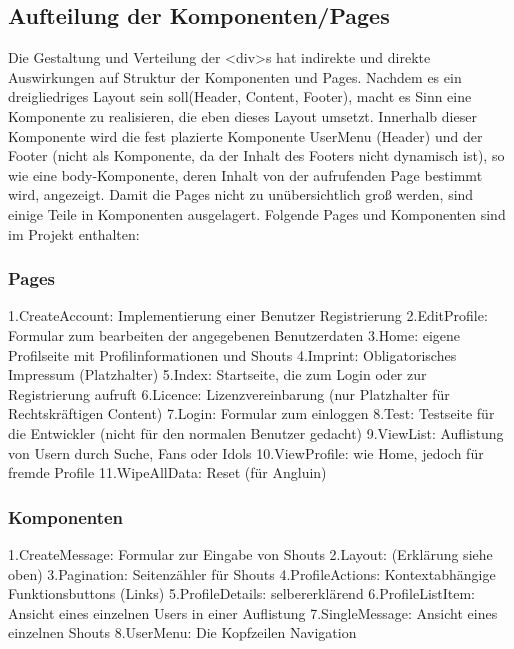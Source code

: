 \documentclass[12pt,a4paper]{article}
\begin{document}
\subsection{Aufteilung der Komponenten/Pages}
Die Gestaltung und Verteilung der <div>s hat indirekte und direkte Auswirkungen auf Struktur der Komponenten und Pages. Nachdem es ein dreigliedriges Layout sein soll(Header, Content, Footer), macht es Sinn eine Komponente zu realisieren, die eben dieses Layout umsetzt. Innerhalb dieser Komponente wird die fest plazierte Komponente UserMenu (Header) und der Footer (nicht als Komponente, da der Inhalt des Footers nicht dynamisch ist), so wie eine body-Komponente, deren Inhalt von der aufrufenden Page bestimmt wird, angezeigt. Damit die Pages nicht zu unübersichtlich groß werden, sind einige Teile in Komponenten ausgelagert. Folgende Pages und Komponenten sind im Projekt enthalten:

\subsubsection{Pages}
1.CreateAccount: Implementierung einer Benutzer Registrierung
2.EditProfile: Formular zum bearbeiten der angegebenen Benutzerdaten
3.Home: eigene Profilseite mit Profilinformationen und Shouts
4.Imprint: Obligatorisches Impressum (Platzhalter)
5.Index: Startseite, die zum Login oder zur Registrierung aufruft
6.Licence: Lizenzvereinbarung (nur Platzhalter für Rechtskräftigen Content) 
7.Login: Formular zum einloggen
8.Test: Testseite für die Entwickler (nicht für den normalen Benutzer gedacht)
9.ViewList: Auflistung von Usern durch Suche, Fans oder Idols
10.ViewProfile: wie Home, jedoch für fremde Profile
11.WipeAllData: Reset (für Angluin)

\subsubsection{Komponenten}
1.CreateMessage: Formular zur Eingabe von Shouts
2.Layout: (Erklärung siehe oben)
3.Pagination: Seitenzähler für Shouts
4.ProfileActions: Kontextabhängige Funktionsbuttons (Links)
5.ProfileDetails: selbererklärend
6.ProfileListItem: Ansicht eines einzelnen Users in einer Auflistung
7.SingleMessage: Ansicht eines einzelnen Shouts
8.UserMenu: Die Kopfzeilen Navigation
\end{document}
